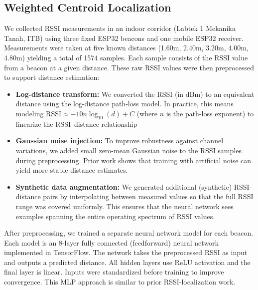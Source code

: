 \subsection{Weighted Centroid Localization}
We collected RSSI measurements in an indoor corridor (Labtek 1 Mekanika Tanah, ITB) using three fixed ESP32 beacons and one mobile ESP32 receiver. Measurements were taken at five known distances (1.60m, 2.40m, 3.20m, 4.00m, 4.80m) yielding a total of 1574 samples. Each sample consists of the RSSI value from a beacon at a given distance. These raw RSSI values were then preprocessed to support distance estimation: \begin{itemize}

\item {\bf Log-distance transform:} We converted the RSSI (in dBm) to an equivalent distance using the log-distance path-loss model. In practice, this means modeling $\text{RSSI}\approx -10n\log_{10}(d)+C$ (where $n$ is the path-loss exponent) to linearize the RSSI–distance relationship

\item {\bf Gaussian noise injection:} To improve robustness against channel variations, we added small zero-mean Gaussian noise to the RSSI samples during preprocessing. Prior work shows that training with artificial noise can yield more stable distance estimates.

\item {\bf Synthetic data augmentation:} We generated additional (synthetic) RSSI-distance pairs by interpolating between measured values so that the full RSSI range was covered uniformly. This ensures that the neural network sees examples spanning the entire operating spectrum of RSSI values.

\end{itemize} After preprocessing, we trained a separate neural network model for each beacon. Each model is an 8-layer fully connected (feedforward) neural network implemented in TensorFlow. The network takes the preprocessed RSSI as input and outputs a predicted distance. All hidden layers use ReLU activation and the final layer is linear. Inputs were standardized before training to improve convergence. This MLP approach is similar to prior RSSI‐localization work.

